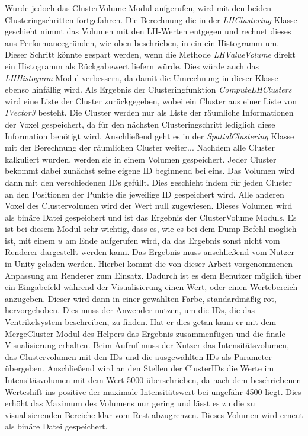 \newline
Wurde jedoch das ClusterVolume Modul aufgerufen, wird mit den beiden Clusteringschritten fortgefahren.
Die Berechnung die in der \textit{LHClustering} Klasse geschieht nimmt das Volumen mit den LH-Werten entgegen und rechnet dieses aus Performancegründen, wie oben beschrieben, in ein ein Histogramm um. Dieser Schritt könnte gespart werden, wenn die Methode \textit{LHValueVolume} direkt ein Histogramm als Rückgabewert liefern würde. Dies würde auch das \textit{LHHistogram} Modul verbessern, da damit die Umrechnung in dieser Klasse ebenso hinfällig wird. Als Ergebnis der Clusteringfunktion \textit{ComputeLHClusters} wird eine Liste der Cluster zurückgegeben, wobei ein Cluster aus einer Liste von \textit{IVector3} besteht. Die Cluster werden nur als Liste der räumliche Informationen der Voxel gespeichert, da für den nächsten Clusteringschritt  lediglich diese Information benötigt wird. 
\newline
Anschließend geht es in der \textit{SpatialClustering} Klasse mit der Berechnung der räumlichen Cluster weiter...
\newline
Nachdem alle Cluster kalkuliert wurden, werden sie in einem Volumen gespeichert. Jeder Cluster bekommt dabei zunächst seine eigene ID beginnend bei eins. Das Volumen wird dann mit den verschiedenen IDs gefüllt. Dies geschieht indem für jeden Cluster an den Positionen der Punkte die jeweilige ID gespeichert wird. Alle anderen Voxel des Clustervolumen wird der Wert null zugewiesen. Dieses Volumen wird als binäre Datei gespeichert und ist das Ergebnis der ClusterVolume Moduls. Es ist bei diesem Modul sehr wichtig, dass es, wie es bei dem Dump Befehl möglich ist, mit einem $u$ am Ende aufgerufen wird, da das Ergebnis sonst nicht vom Renderer dargestellt werden kann.
\newline
Das Ergebnis muss anschließend vom Nutzer in Unity geladen werden. Hierbei kommt die von dieser Arbeit vorgenommenen Anpassung am Renderer zum Einsatz. Dadurch ist es dem Benutzer möglich über ein Eingabefeld während der Visualisierung einen Wert, oder einen Wertebereich anzugeben. Dieser wird dann in einer gewählten Farbe, standardmäßig rot, hervorgehoben. Dies muss der Anwender nutzen, um die IDs, die das Ventrikelsystem beschreiben, zu finden.
\newline
Hat er dies getan kann er mit dem MergeCluster Modul des Helpers das Ergebnis zusammenfügen und die finale Visualisierung erhalten. Beim Aufruf muss der Nutzer das Intensitätsvolumen, das Clustervolumen mit den IDs und die ausgewählten IDs als Parameter übergeben. Anschließend wird an den Stellen der ClusterIDs die Werte im Intensitäsvolumen mit dem Wert 5000 überschrieben, da nach dem beschriebenen Werteshift ins positive der maximale Intensitätswert bei ungefähr 4500 liegt. Dies erhöht das Maximum des Volumens nur gering und lässt es zu die zu visualisierenden Bereiche klar vom Rest abzugrenzen. Dieses Volumen wird erneut als binäre Datei gespeichert.
